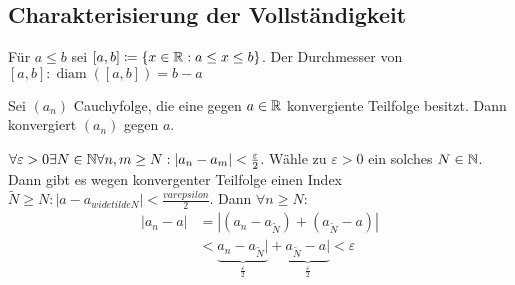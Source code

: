 \documentclass[consecutivenumbering]{gadsescript}
\begin{document}
\subsection{Charakterisierung der Vollständigkeit}
Für $ a \leq b $ sei $ [a, b] \coloneqq \{ x \in \mathbb{R} : a \leq x \leq b \} $. Der Durchmesser von $ [ a, b ] : \operatorname{diam}([a, b]) = b - a $

\begin{sublemma}
	Sei $ (a_n) $ Cauchyfolge, die eine gegen $ a\in \mathbb{R} $ konvergiente Teilfolge besitzt. Dann konvergiert $ (a_n ) $ gegen $ a $.
	\begin{subproof*}
		$\forall\varepsilon > 0 \exists N \in \mathbb{N} \forall n, m \geq N : | a_n - a_m | < \frac{\varepsilon}{2} $. Wähle zu $ \varepsilon > 0 $ ein solches $ N \in \mathbb{N} $.
		Dann gibt es wegen konvergenter Teilfolge einen Index $ \widetilde{N} \geq N : | a - a_{widetilde{N}} | < \frac{varepsilon}{2}$.
		Dann $ \forall n \geq N : $
		\begin{align*}
			| a_n - a | &= | ( a_n - a_{\widetilde{N}} ) + ( a_{\widetilde{N}} - a ) |\\
			&< \underbrace{a_n - a_{\widetilde{N}}|}_{\frac{\varepsilon}{2}} + \underbrace{a_{\widetilde{N}} - a|}_{\frac{\varepsilon}{2}} < \varepsilon
		\end{align*}
	\end{subproof*}
\end{sublemma}
\end{document}
